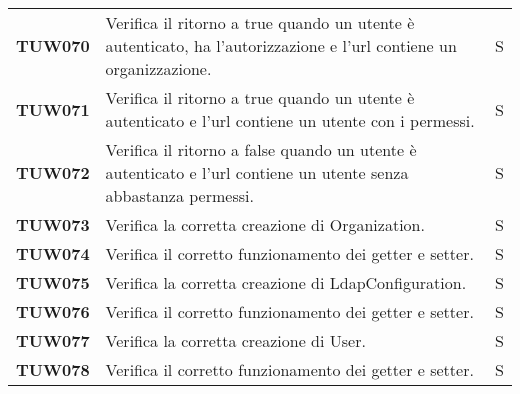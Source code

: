 \documentclass[../../piano-di-qualifica.tex]{subfiles}
\begin{document}
\begin{longtable}[H]{>{\centering\bfseries}m{3cm} >{}m{10cm} >{\centering\arraybackslash}m{3cm}}
  TUW070             & Verifica il ritorno a true quando un utente è autenticato, ha l'autorizzazione e l'url contiene un organizzazione.  & S                             \\

  TUW071             & Verifica il ritorno a true quando un utente è autenticato e l'url contiene un utente con i permessi.                & S                             \\

  TUW072             & Verifica il ritorno a false quando un utente è autenticato e l'url contiene un utente senza abbastanza permessi.    & S                             \\



  TUW073             & Verifica la corretta creazione di Organization.                                                                     & S                             \\

  TUW074             & Verifica il corretto funzionamento dei getter e setter.                                                             & S                             \\


  TUW075             & Verifica la corretta creazione di LdapConfiguration.                                                                & S                             \\

  TUW076             & Verifica il corretto funzionamento dei getter e setter.                                                             & S                             \\



  TUW077             & Verifica la corretta creazione di User.                                                                             & S                             \\

  TUW078             & Verifica il corretto funzionamento dei getter e setter.                                                             & S                             \\



\end{longtable}
\end{document}
